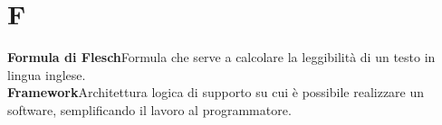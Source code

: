 \newpage
\section{F}\label{l:F}

\textbf{Formula di Flesch}\newline Formula che serve a calcolare la leggibilità di un testo in lingua inglese.\\
\newline
\textbf{Framework}\newline Architettura logica di supporto su cui è possibile realizzare un software, semplificando il lavoro al programmatore.